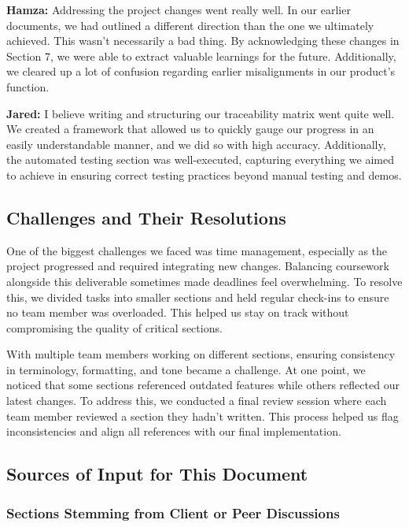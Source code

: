 \documentclass[12pt, titlepage]{article}
\begin{document}
\begin{enumerate}
  \textbf{Hamza:} Addressing the project changes went really well. In our earlier documents, we had outlined a different direction than the one we ultimately achieved. This wasn't necessarily a bad thing. By acknowledging these changes in Section 7, we were able to extract valuable learnings for the future. Additionally, we cleared up a lot of confusion regarding earlier misalignments in our product's function.
  
  \textbf{Jared:} I believe writing and structuring our traceability matrix went quite well. We created a framework that allowed us to quickly gauge our progress in an easily understandable manner, and we did so with high accuracy. Additionally, the automated testing section was well-executed, capturing everything we aimed to achieve in ensuring correct testing practices beyond manual testing and demos.
  
  \subsection{Challenges and Their Resolutions}
  
  One of the biggest challenges we faced was time management, especially as the project progressed and required integrating new changes. Balancing coursework alongside this deliverable sometimes made deadlines feel overwhelming. To resolve this, we divided tasks into smaller sections and held regular check-ins to ensure no team member was overloaded. This helped us stay on track without compromising the quality of critical sections.
  
  With multiple team members working on different sections, ensuring consistency in terminology, formatting, and tone became a challenge. At one point, we noticed that some sections referenced outdated features while others reflected our latest changes. To address this, we conducted a final review session where each team member reviewed a section they hadn't written. This process helped us flag inconsistencies and align all references with our final implementation.
  
  \subsection{Sources of Input for This Document}
  
  \subsubsection{Sections Stemming from Client or Peer Discussions}
  

\end{enumerate}
\end{document}
